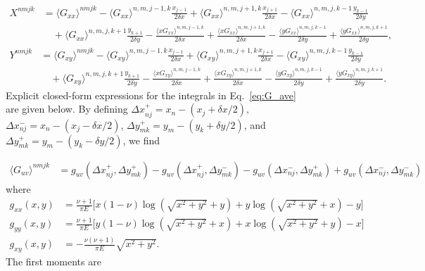 \documentclass[aps,prl,reprint,twocolumn,groupedaddress,showpacs]{revtex4}
\begin{document}
\begin{figure}
\begin{widetext}
\begin{align}
X^{nmjk} & = \langle G_{xx} \rangle^{nmjk} - 
\langle G_{xx}\rangle^{n,m,j-1,k}\frac{x_{j-1}}{2\delta x}
+ \langle G_{xx} \rangle^{n,m,j+1,k}\frac{x_{j+1}}{2\delta x} 
-  \langle G_{xx} \rangle^{n,m,j,k-1}\frac{y_{k-1}}{2\delta y}  \nonumber\\
\: &\quad + \langle G_{xx} \rangle^{n,m,j,k+1}\frac{y_{k+1}}{2\delta y} 
-\frac{\langle xG_{xx} \rangle^{n,m,j-1,k}}{2\delta x}
+\frac{\langle xG_{xx} \rangle^{n,m,j+1,k}}{2\delta x} 
- \frac{\langle yG_{xx} \rangle^{n,m,j,k-1}}{2\delta y} 
+\frac{\langle yG_{xx} \rangle^{n,m,j,k+1}}{2\delta y}, 
\label{eq:linearsystemX}
\end{align}
\begin{align}
Y^{nmjk} & =  \langle G_{xy} \rangle^{nmjk} 
- \langle G_{xy} \rangle^{n,m,j-1,k}\frac{x_{j-1}}{2\delta x}
+\langle G_{xy} \rangle^{n,m,j+1,k}\frac{x_{j+1}}{2\delta x} 
- \langle G_{xy} \rangle^{n,m,j,k-1}\frac{y_{k-1}}{2\delta y} \nonumber\\
\: & \quad+\langle G_{xy} \rangle^{n,m,j,k+1}\frac{y_{k+1}}{2\delta y}  
-\frac{\langle xG_{xy} \rangle^{n,m,j-1,k}}{2\delta x}+
\frac{\langle xG_{xy} \rangle^{n,m,j+1,k}}{2\delta x} 
- \frac{\langle yG_{xy} \rangle^{n,m,j,k-1}}{2\delta y} 
+\frac{\langle yG_{xy} \rangle^{n,m,j,k+1}}{2\delta y}.
\label{eq:linearsystemY}
\end{align}
%
Explicit closed-form expressions for the integrals in
Eq.~\ref{eq:G_ave} are given below. By defining $\Delta x_{nj}^+ = x_n -
(x_j+\delta x/2),$ $\Delta x_{nj}^- = x_n - (x_j-\delta x/2)$, $\Delta
y_{mk}^+ = y_m - (y_k+\delta y/2)$, and $\Delta y_{mk}^+ = y_m -
(y_k-\delta y/2)$, we find

\begin{align}
\langle G_{uv}\rangle^{nmjk} &=   g_{uv}( \Delta x_{nj}^+,\Delta y_{mk}^+) - g_{uv}( \Delta x_{nj}^+,\Delta y_{mk}^-)
-g_{uv}(\Delta x_{nj}^-, \Delta y_{mk}^+) + g_{uv}(\Delta x_{nj}^- , \Delta y_{mk}^-)
\end{align}
where
\begin{align}
g_{xx}(x,y) &= \frac{\nu+1}{\pi E}\Bigg[ x(1-\nu ) \log\left( \sqrt{x^2+y^2}+y\right)
+ y \log\left(\sqrt{x^2+y^2} +x\right)-y  \Bigg] \label{eq:fxx} \\
g_{yy}(x,y) &= \frac{\nu+1}{\pi E}\Bigg[ y(1-\nu ) \log\left( \sqrt{x^2+y^2}+x\right)
+ x \log\left(\sqrt{x^2+y^2} +y\right)-x  \Bigg] \label{eq:fyy} \\
g_{xy}(x,y) &= -\frac{\nu(\nu+1)}{\pi E}\sqrt{x^2+y^2}. \label{eq:fxy}
\end{align}
%
The first moments are


\end{widetext}
\end{figure}
\end{document}
